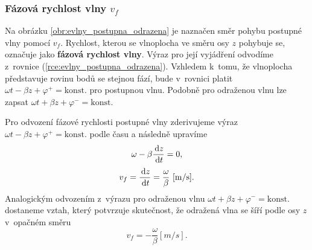 \subsubsection*{Fázová rychlost vlny $v_{f}$}
Na obrázku \ref{obr:evlny_postupna_odrazena} je naznačen směr pohybu postupné vlny pomocí $v_{f}$. Rychlost, kterou se vlnoplocha ve směru osy $z$ pohybuje se, označuje jako {\bf fázová rychlost vlny}. Výraz pro její vyjádření odvodíme z~rovnice (\ref{rce:evlny_postupna_odrazena}). Vzhledem k~tomu, že vlnoplocha představuje rovinu bodů se stejnou fází, bude v~rovnici platit $\omega t - \beta z + \varphi^{+} = \mathrm{konst.}$ pro postupnou vlnu. Podobně pro odraženou vlnu lze zapsat $\omega t + \beta z + \varphi^{-} = \mathrm{konst.}$

Pro odvození fázové rychlosti postupné vlny zderivujeme výraz $\omega t - \beta z + \varphi^{+} = \mathrm{konst.}$ podle času a následně upravíme
\begin{displaymath}
	\omega - \beta \frac{\,\mathrm{d} z}{\,\mathrm{d} t} = 0,
\end{displaymath}
\begin{displaymath}
	v_{f} = \frac{\,\mathrm{d} z}{\,\mathrm{d} t} = \frac{\omega}{\beta}\mathrm{\ [m/s]}.
\end{displaymath}
Analogickým odvozením z~výrazu pro odraženou vlnu  $\omega t + \beta z + \varphi^{-} = \mathrm{konst.}$ dostaneme vztah, který potvrzuje skutečnost, že odražená vlna se šíří podle osy $z$ v~opačném směru 
\begin{displaymath}
	v_{f} = - \frac{\omega}{\beta}\unit{[m/s]}.
\end{displaymath}

